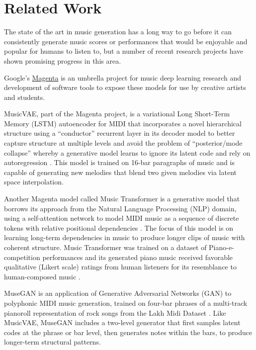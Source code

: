 \documentclass[sigconf,authorversion]{acmart}
\begin{document}
\section{Related Work}

The state of the art in music generation has a long way to go before
it can consistently generate music scores or performances that would
be enjoyable and popular for humans to listen to, but a number of
recent research projects have shown promising progress in this area.

Google's \href{https://magenta.tensorflow.org/}{Magenta} is an
umbrella project for music deep learning research and development of
software tools to expose these models for use by creative artists and
students.

MusicVAE, part of the Magenta project, is a variational Long
Short-Term Memory (LSTM) autoencoder for MIDI that incorporates a
novel hierarchical structure using a ``conductor'' recurrent layer in
its decoder model to better capture structure at multiple levels and
avoid the problem of ``posterior/mode collapse'' whereby a generative
model learns to ignore its latent code and rely on autoregression
\cite{roberts_hierarchical_2018}. This model is trained on 16-bar
paragraphs of music and is capable of generating new melodies that
blend two given melodies via latent space interpolation.

Another Magenta model called Music Transformer is a generative model
that borrows its approach from the Natural Language Processing (NLP)
domain, using a self-attention network to model MIDI music as a
sequence of discrete tokens with relative positional dependencies
\cite{huang_music_2018}. The focus of this model is on learning
long-term dependencies in music to produce longer clips of music with
coherent structure. Music Transformer was trained on a dataset of
Piano-e-competition performances \cite{hawthorne2019enabling} and its
generated piano music received favorable qualitative (Likert scale)
ratings from human listeners for its resemblance to human-composed
music \cite{huang_music_2018}.

MuseGAN \cite{dong2017musegan} is an application of Generative
Adversarial Networks (GAN) to polyphonic MIDI music generation,
trained on four-bar phrases of a multi-track pianoroll representation
of rock songs from the Lakh Midi Dataset
\cite{raffel_learning-based_2016}. Like MusicVAE, MuseGAN includes a
two-level generator that first samples latent codes at the phrase or
bar level, then generates notes within the bars, to produce
longer-term structural patterns.
\end{document}
